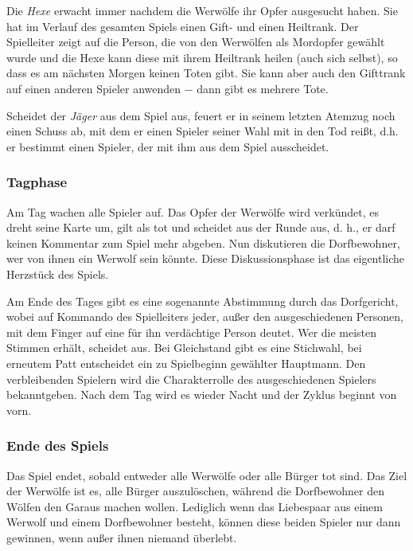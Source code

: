 \documentclass[12pt, a4paper]{article}
\begin{document}
\vspace{0,3 cm}

Die \textit{Hexe} erwacht immer nachdem die Werwölfe ihr Opfer ausgesucht haben.
Sie hat im Verlauf des gesamten Spiels einen Gift- und einen Heiltrank.
Der Spielleiter zeigt auf die Person, die von den Werwölfen als Mordopfer gewählt wurde und die
Hexe kann diese mit ihrem Heiltrank heilen (auch sich selbst), so dass es am nächsten Morgen keinen
Toten gibt. Sie kann aber auch den Gifttrank auf einen anderen Spieler anwenden $-$ dann gibt es mehrere Tote.

\vspace{0,3 cm} 

Scheidet der \textit{Jäger} aus dem Spiel aus, feuert er in seinem letzten Atemzug noch einen Schuss ab,
mit dem er einen Spieler seiner Wahl mit in den Tod reißt, d.h. er bestimmt einen Spieler,
der mit ihm aus dem Spiel ausscheidet.


		\subsubsection{Tagphase}
Am Tag wachen alle Spieler auf. Das Opfer der Werwölfe wird verkündet, es dreht seine Karte um,
gilt als tot und scheidet aus der Runde aus, d. h., er darf keinen Kommentar zum Spiel mehr abgeben.
Nun diskutieren die Dorfbewohner, wer von ihnen ein Werwolf sein könnte. Diese Diskussionsphase
ist das eigentliche Herzstück des Spiels.

\vspace{0,3 cm}
Am Ende des Tages gibt es eine sogenannte Abstimmung durch das Dorfgericht, wobei auf Kommando des
Spielleiters jeder, außer den ausgeschiedenen Personen, mit dem Finger auf eine für ihn verdächtige
Person deutet. Wer die meisten Stimmen erhält, scheidet aus. Bei Gleichstand gibt es eine Stichwahl,
bei erneutem Patt entscheidet ein zu Spielbeginn gewählter Hauptmann. Den verbleibenden Spielern
wird die Charakterrolle des ausgeschiedenen Spielers bekanntgeben. Nach dem Tag wird es wieder
Nacht und der Zyklus beginnt von vorn.


		\subsubsection{Ende des Spiels}
Das Spiel endet, sobald entweder alle Werwölfe oder alle Bürger tot sind.
Das Ziel der Werwölfe ist es, alle Bürger auszulöschen, während die Dorfbewohner den Wölfen den
Garaus machen wollen. Lediglich wenn das Liebespaar aus einem Werwolf und einem Dorfbewohner besteht,
können diese beiden Spieler nur dann gewinnen, wenn außer ihnen niemand überlebt.
\end{document}
